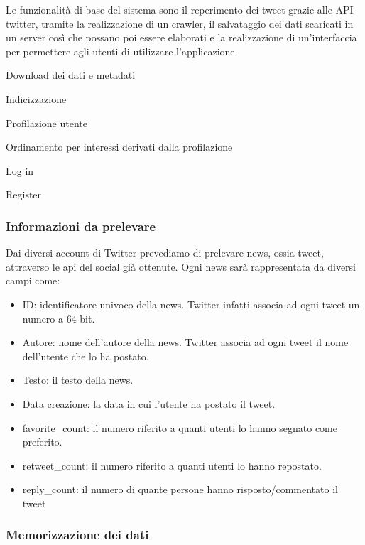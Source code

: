 \documentclass[12pt]{article}
\begin{document}
Le funzionalità di base del sistema sono il reperimento dei tweet grazie alle API-twitter, tramite la realizzazione di un crawler, il salvataggio dei dati scaricati in un server così che possano poi essere elaborati e la realizzazione di un’interfaccia per permettere agli utenti di utilizzare l’applicazione.

Download dei dati e metadati

Indicizzazione

Profilazione utente

Ordinamento per interessi derivati dalla profilazione

Log in

Register

\subsubsection{Informazioni da prelevare}

Dai diversi account di Twitter prevediamo di prelevare news, ossia tweet, attraverso le api del social già ottenute. 
Ogni news sarà rappresentata da diversi campi come:

\begin{itemize}
\item ID: identificatore univoco della news. Twitter infatti associa ad ogni tweet un numero a 64 bit.

\item Autore: nome dell’autore della news. Twitter associa ad ogni tweet il nome dell’utente che lo ha postato.

\item Testo: il testo della news.

\item Data creazione: la data in cui l’utente ha postato il tweet.

\item favorite\_count: il numero riferito a quanti utenti lo hanno segnato come preferito.

\item retweet\_count: il numero riferito a quanti utenti lo hanno repostato.

\item reply\_count: il numero di quante persone hanno risposto/commentato il tweet
\end{itemize}

\subsubsection{Memorizzazione dei dati}
\end{document}
